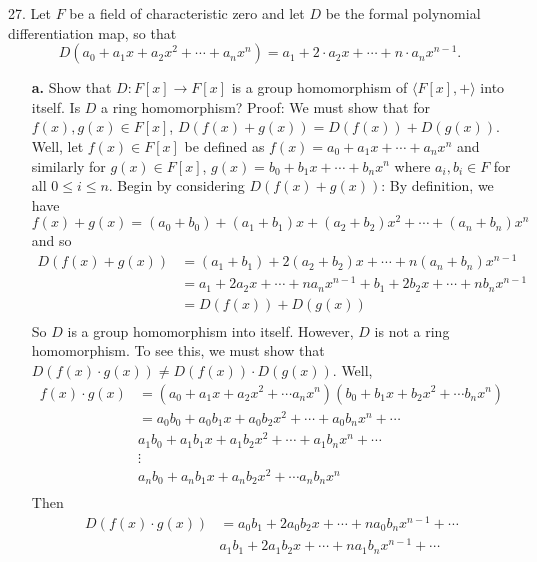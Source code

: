 \documentclass{article}
\begin{document}
27. Let $F$ be a field of characteristic zero and let $D$ be the formal polynomial differentiation map, so that 
\[D(a_0 + a_1x + a_2x^2 + \cdots + a_nx^n) = a_1 + 2\cdot a_2x + \cdots + n\cdot a_nx^{n-1}.\]
\begin{itemize}
    \item[\textbf{a.}] Show that $D : F[x] \to F[x]$ is a group homomorphism of $\langle F[x], + \rangle$ into itself. Is $D$ a ring homomorphism?
    \newline
    Proof: We must show that for $f(x), g(x) \in F[x]$, $D(f(x) + g(x)) = D(f(x)) + D(g(x))$. Well, let $f(x) \in F[x]$ be defined as $f(x) = a_0 + a_1x + \cdots + a_nx^n$ and similarly for $g(x) \in F[x]$, $g(x) = b_0 + b_1x + \cdots + b_nx^n$ where $a_i,b_i \in F$ for all $0 \leq i \leq n$. Begin by considering $D(f(x) + g(x))$:
    \newline
    By definition, we have
    \[f(x) + g(x) = (a_0 + b_0) + (a_1 + b_1)x + (a_2 + b_2)x^2 + \cdots + (a_n + b_n)x^n\]
    and so
    \begin{align*}
        D(f(x) + g(x)) &= (a_1 + b_1) + 2(a_2 + b_2)x + \cdots + n(a_n + b_n)x^{n-1} \\
        &= a_1 + 2a_2x + \cdots + na_nx^{n-1} + b_1 + 2b_2x + \cdots +nb_nx^{n-1} \\
        &= D(f(x)) + D(g(x)) \\
    \end{align*}
    So $D$ is a group homomorphism into itself. 
    \newline\newline
    However, $D$ is not a ring homomorphism. To see this, we must show that $D(f(x)\cdot g(x)) \neq D(f(x))\cdot D(g(x))$. Well,
    \begin{align*}
        f(x)\cdot g(x) &= (a_0 + a_1x + a_2x^2 + \cdots a_nx^n)(b_0 + b_1x + b_2x^2 + \cdots b_nx^n) \\
        &= a_0b_0 + a_0b_1x + a_0b_2x^2 + \cdots + a_0b_nx^n + \cdots \\
        &  a_1b_0 + a_1b_1x + a_1b_2x^2 + \cdots + a_1b_nx^n + \cdots \\
        & \vdots\\
        & a_nb_0 + a_nb_1x + a_nb_2x^2 + \cdots a_nb_nx^n \\
    \end{align*}
    Then
    \begin{align*}
        D(f(x) \cdot g(x)) &= a_0b_1 + 2a_0b_2x + \cdots + na_0b_nx^{n-1} + \cdots\\
        &a_1b_1 + 2a_1b_2x + \cdots + na_1b_nx^{n-1} + \cdots \\

\end{align*}
\end{itemize}
\end{document}
